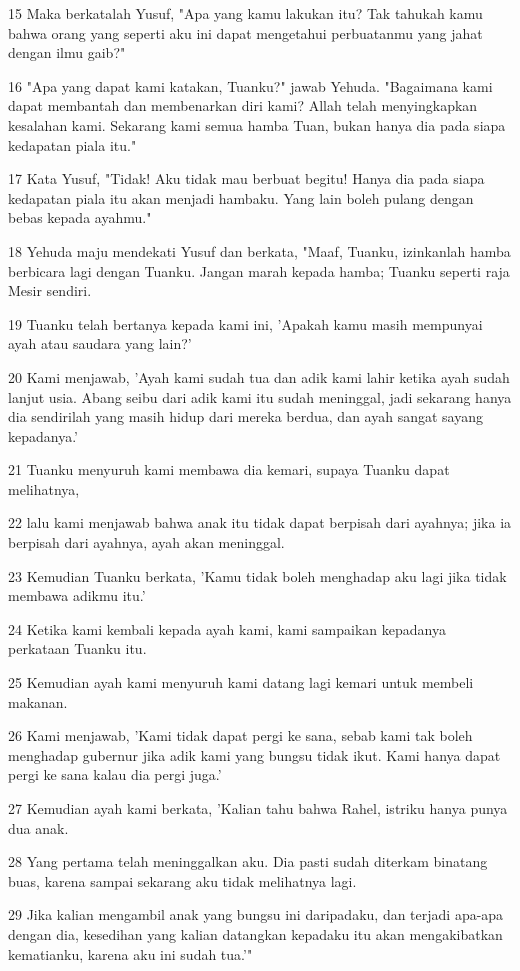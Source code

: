 \par 15 Maka berkatalah Yusuf, "Apa yang kamu lakukan itu? Tak tahukah kamu bahwa orang yang seperti aku ini dapat mengetahui perbuatanmu yang jahat dengan ilmu gaib?"
\par 16 "Apa yang dapat kami katakan, Tuanku?" jawab Yehuda. "Bagaimana kami dapat membantah dan membenarkan diri kami? Allah telah menyingkapkan kesalahan kami. Sekarang kami semua hamba Tuan, bukan hanya dia pada siapa kedapatan piala itu."
\par 17 Kata Yusuf, "Tidak! Aku tidak mau berbuat begitu! Hanya dia pada siapa kedapatan piala itu akan menjadi hambaku. Yang lain boleh pulang dengan bebas kepada ayahmu."
\par 18 Yehuda maju mendekati Yusuf dan berkata, "Maaf, Tuanku, izinkanlah hamba berbicara lagi dengan Tuanku. Jangan marah kepada hamba; Tuanku seperti raja Mesir sendiri.
\par 19 Tuanku telah bertanya kepada kami ini, 'Apakah kamu masih mempunyai ayah atau saudara yang lain?'
\par 20 Kami menjawab, 'Ayah kami sudah tua dan adik kami lahir ketika ayah sudah lanjut usia. Abang seibu dari adik kami itu sudah meninggal, jadi sekarang hanya dia sendirilah yang masih hidup dari mereka berdua, dan ayah sangat sayang kepadanya.'
\par 21 Tuanku menyuruh kami membawa dia kemari, supaya Tuanku dapat melihatnya,
\par 22 lalu kami menjawab bahwa anak itu tidak dapat berpisah dari ayahnya; jika ia berpisah dari ayahnya, ayah akan meninggal.
\par 23 Kemudian Tuanku berkata, 'Kamu tidak boleh menghadap aku lagi jika tidak membawa adikmu itu.'
\par 24 Ketika kami kembali kepada ayah kami, kami sampaikan kepadanya perkataan Tuanku itu.
\par 25 Kemudian ayah kami menyuruh kami datang lagi kemari untuk membeli makanan.
\par 26 Kami menjawab, 'Kami tidak dapat pergi ke sana, sebab kami tak boleh menghadap gubernur jika adik kami yang bungsu tidak ikut. Kami hanya dapat pergi ke sana kalau dia pergi juga.'
\par 27 Kemudian ayah kami berkata, 'Kalian tahu bahwa Rahel, istriku hanya punya dua anak.
\par 28 Yang pertama telah meninggalkan aku. Dia pasti sudah diterkam binatang buas, karena sampai sekarang aku tidak melihatnya lagi.
\par 29 Jika kalian mengambil anak yang bungsu ini daripadaku, dan terjadi apa-apa dengan dia, kesedihan yang kalian datangkan kepadaku itu akan mengakibatkan kematianku, karena aku ini sudah tua.'"
